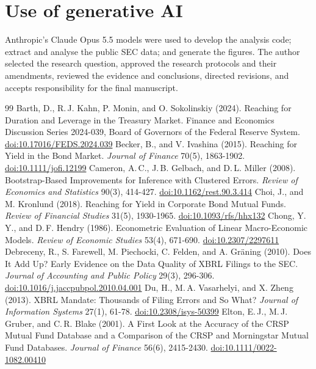 \documentclass[11pt]{article}
\newcommand{\doi}[1]{\href{https://doi.org/#1}{doi:#1}}
\begin{document}
\section*{Use of generative AI}
Anthropic's Claude Opus 5.5 models were used to develop the analysis code; extract and analyse the
public SEC data; and generate the figures. The author selected the research question, approved the research protocols and their
amendments, reviewed the evidence and conclusions, directed revisions, and accepts responsibility for
the final manuscript.

\begin{thebibliography}{99}\small\setlength{\itemsep}{2pt}
 Barth, D., R.\,J. Kahn, P. Monin, and O. Sokolinskiy (2024). Reaching for Duration and Leverage in the Treasury Market. Finance and Economics Discussion Series 2024-039, Board of Governors of the Federal Reserve System. \doi{10.17016/FEDS.2024.039}
 Becker, B., and V. Ivashina (2015). Reaching for Yield in the Bond Market. \emph{Journal of Finance} 70(5), 1863-1902. \doi{10.1111/jofi.12199}
 Cameron, A.\,C., J.\,B. Gelbach, and D.\,L. Miller (2008). Bootstrap-Based Improvements for Inference with Clustered Errors. \emph{Review of Economics and Statistics} 90(3), 414-427. \doi{10.1162/rest.90.3.414}
 Choi, J., and M. Kronlund (2018). Reaching for Yield in Corporate Bond Mutual Funds. \emph{Review of Financial Studies} 31(5), 1930-1965. \doi{10.1093/rfs/hhx132}
 Chong, Y.\,Y., and D.\,F. Hendry (1986). Econometric Evaluation of Linear Macro-Economic Models. \emph{Review of Economic Studies} 53(4), 671-690. \doi{10.2307/2297611}
 Debreceny, R., S. Farewell, M. Piechocki, C. Felden, and A. Gr\"aning (2010). Does It Add Up? Early Evidence on the Data Quality of XBRL Filings to the SEC. \emph{Journal of Accounting and Public Policy} 29(3), 296-306. \doi{10.1016/j.jaccpubpol.2010.04.001}
 Du, H., M.\,A. Vasarhelyi, and X. Zheng (2013). XBRL Mandate: Thousands of Filing Errors and So What? \emph{Journal of Information Systems} 27(1), 61-78. \doi{10.2308/isys-50399}
 Elton, E.\,J., M.\,J. Gruber, and C.\,R. Blake (2001). A First Look at the Accuracy of the CRSP Mutual Fund Database and a Comparison of the CRSP and Morningstar Mutual Fund Databases. \emph{Journal of Finance} 56(6), 2415-2430. \doi{10.1111/0022-1082.00410}

\end{thebibliography}
\end{document}
